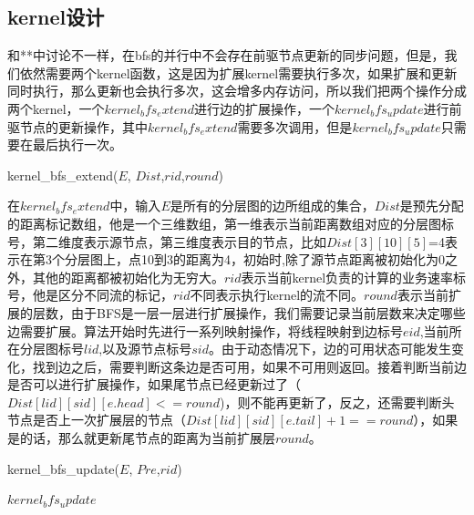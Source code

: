 \subsection{kernel设计}
  和**中讨论不一样，在bfs的并行中不会存在前驱节点更新的同步问题，但是，我们依然需要两个kernel函数，这是因为扩展kernel需要执行多次，如果扩展和更新同时执行，那么更新也会执行多次，这会增多内存访问，所以我们把两个操作分成两个kernel，一个$kernel_bfs_extend$进行边的扩展操作，一个$kernel_bfs_update$进行前驱节点的更新操作，其中$kernel_bfs_extend$需要多次调用，但是$kernel_bfs_update$只需要在最后执行一次。
\begin{algorithm}[t]
\begin{algorithmic}[1]
\caption{\small{kernel\_bfs\_extend($E$, $Dist$,$rid$,$round$)}}
\label{KernelBFS}
\EndIf
{}
\EndIf
\Return
\end{algorithmic}
\end{algorithm} 
 在$kernel_bfs_extend$中，输入$E$是所有的分层图的边所组成的集合，$Dist$是预先分配的距离标记数组，他是一个三维数组，第一维表示当前距离数组对应的分层图标号，第二维度表示源节点，第三维度表示目的节点，比如$Dist[3][10][5]$=4表示在第3个分层图上，点10到3的距离为4，初始时,除了源节点距离被初始化为0之外，其他的距离都被初始化为无穷大。$rid$表示当前kernel负责的计算的业务速率标号，他是区分不同流的标记，$rid$不同表示执行kernel的流不同。$round$表示当前扩展的层数，由于BFS是一层一层进行扩展操作，我们需要记录当前层数来决定哪些边需要扩展。算法开始时先进行一系列映射操作，将线程映射到边标号$eid$,当前所在分层图标号$lid$,以及源节点标号$sid$。由于动态情况下，边的可用状态可能发生变化，找到边之后，需要判断这条边是否可用，如果不可用则返回。接着判断当前边是否可以进行扩展操作，如果尾节点已经更新过了（$Dist[lid][sid][e.head]<=round$)，则不能再更新了，反之，还需要判断头节点是否上一次扩展层的节点（$Dist[lid][sid][e.tail]+1==round$），如果是的话，那么就更新尾节点的距离为当前扩展层$round$。
\begin{algorithm}[t]
\begin{algorithmic}[1]
\caption{\small{kernel\_bfs\_update($E$, $Pre$,$rid$)}}
\label{KernelBFS}
\EndIf
{}
\EndIf
\Return
\end{algorithmic}
\end{algorithm} 
 $kernel_bfs_update$
